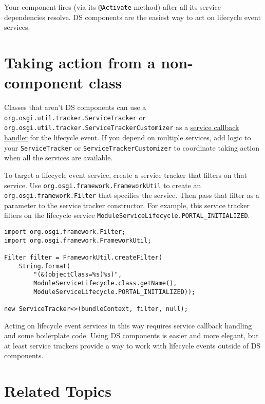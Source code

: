 Your component fires (via its \texttt{@Activate} method) after all its
service dependencies resolve. DS components are the easiest way to act
on lifecycle event services.

\section{Taking action from a non-component
class}\label{taking-action-from-a-non-component-class}

Classes that aren't DS components can use a
\texttt{org.osgi.util.tracker.ServiceTracker} or
\texttt{org.osgi.util.tracker.ServiceTrackerCustomizer} as a
\href{/docs/7-2/frameworks/-/knowledge_base/f/using-a-service-tracker\#creating-a-service-tracker-that-tracks-service-events-using-a-callback-handler}{service
callback handler} for the lifecycle event. If you depend on multiple
services, add logic to your \texttt{ServiceTracker} or
\texttt{ServiceTrackerCustomizer} to coordinate taking action when all
the services are available.

To target a lifecycle event service, create a service tracker that
filters on that service. Use \texttt{org.osgi.framework.FrameworkUtil}
to create an \texttt{org.osgi.framework.Filter} that specifies the
service. Then pass that filter as a parameter to the service tracker
constructor. For example, this service tracker filters on the lifecycle
service \texttt{ModuleServiceLifecycle.PORTAL\_INITIALIZED}.

\begin{verbatim}
import org.osgi.framework.Filter;
import org.osgi.framework.FrameworkUtil;

Filter filter = FrameworkUtil.createFilter(
    String.format(
        "(&(objectClass=%s)%s)",
        ModuleServiceLifecycle.class.getName(),
        ModuleServiceLifecycle.PORTAL_INITIALIZED));

new ServiceTracker<>(bundleContext, filter, null);
\end{verbatim}

Acting on lifecycle event services in this way requires service callback
handling and some boilerplate code. Using DS components is easier and
more elegant, but at least service trackers provide a way to work with
lifecycle events outside of DS components.

\section{Related Topics}\label{related-topics-24}


